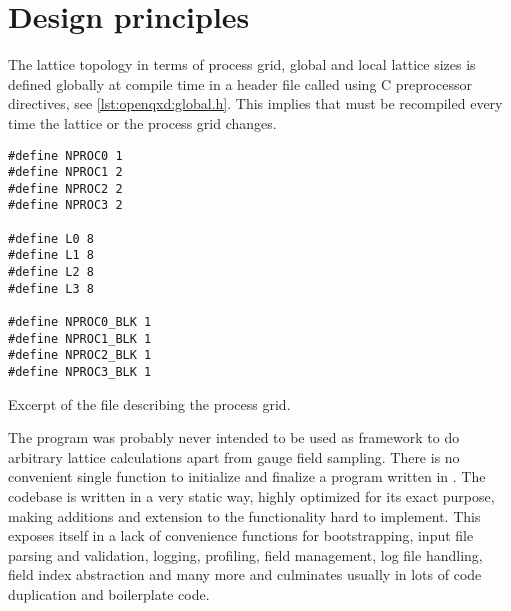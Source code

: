 
\section{Design principles}
\label{sec:openqxd:design}

The lattice topology in terms of process grid, global and local lattice sizes is defined globally at compile time in a header file called  using C preprocessor directives, see \cref{lst:openqxd:global.h}. This implies that \openqxd must be recompiled every time the lattice or the process grid changes.
\begin{codelisting}
\begin{verbatim}
#define NPROC0 1
#define NPROC1 2
#define NPROC2 2
#define NPROC3 2

#define L0 8
#define L1 8
#define L2 8
#define L3 8

#define NPROC0_BLK 1
#define NPROC1_BLK 1
#define NPROC2_BLK 1
#define NPROC3_BLK 1
\end{verbatim}
\caption{Excerpt of the file  describing the \openqxd process grid.}
\label{lst:openqxd:global.h}
\end{codelisting}

The program was probably never intended to be used as framework to do arbitrary lattice calculations apart from gauge field sampling. There is no convenient single function to initialize and finalize a program written in \openqxd. The codebase is written in a very static way, highly optimized for its exact purpose, making additions and extension to the functionality hard to implement. This exposes itself in a lack of convenience functions for bootstrapping, input file parsing and validation, logging, profiling, field management, log file handling, field index abstraction and many more and culminates usually in lots of code duplication and boilerplate code.

